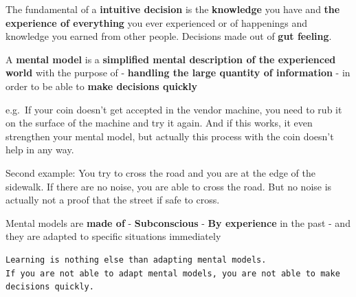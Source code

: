 The fundamental of a \textbf{intuitive decision} is the
\textbf{knowledge} you have and \textbf{the experience of everything}
you ever experienced or of happenings and knowledge you earned from
other people. Decisions made out of \textbf{gut feeling}.

A \textbf{mental model} is a \textbf{simplified mental description of
the experienced world} with the purpose of - \textbf{handling the large
quantity of information} - in order to be able to \textbf{make decisions
quickly}

e.g.~If your coin doesn't get accepted in the vendor machine, you need
to rub it on the surface of the machine and try it again. And if this
works, it even strengthen your mental model, but actually this process
with the coin doesn't help in any way.

Second example: You try to cross the road and you are at the edge of the
sidewalk. If there are no noise, you are able to cross the road. But no
noise is actually not a proof that the street if safe to cross.

Mental models are \textbf{made of} - \textbf{Subconscious} - \textbf{By
experience} in the past - and they are adapted to specific situations
immediately

\begin{verbatim}
Learning is nothing else than adapting mental models.
If you are not able to adapt mental models, you are not able to make decisions quickly.
\end{verbatim}
